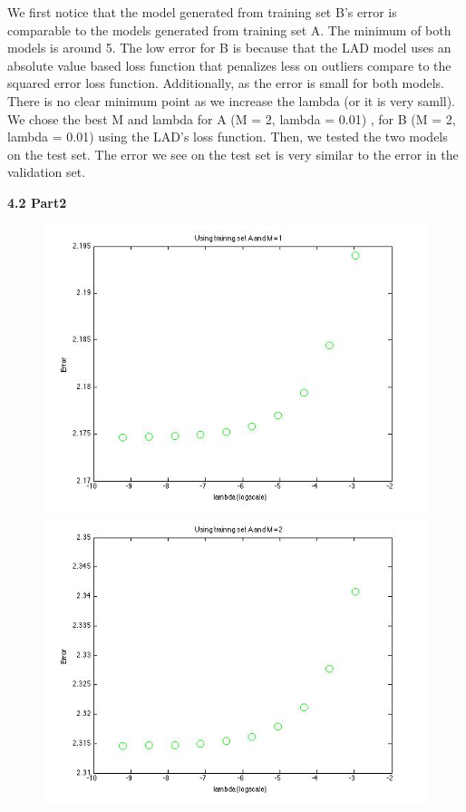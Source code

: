We first notice that the model generated from training set B's error
is comparable to the models generated from training set A. The minimum of
both models is around 5. The low error for B is because that the 
LAD model uses an absolute value based loss function that penalizes less
on outliers compare to the squared error loss function. Additionally, as the error is small for both models. There is no clear minimum point as we increase the lambda (or it is very samll). We chose the best M and lambda for A (M = 2, lambda = 0.01) , for B (M = 2, lambda = 0.01) using the LAD's loss function.  Then, we tested the two models on the test set. The error we see on the test set is very similar to the error in the validation set. 


{\bfseries 4.2 Part2}
\begin{figure}[!htb]
  \includegraphics[width=\linewidth]{figures/p4_LASSO_regressA_m=1}
\endminipage\hfill
{}
  \includegraphics[width=\linewidth]{figures/p4_LASSO_regressA_m=2}

\end{figure}

